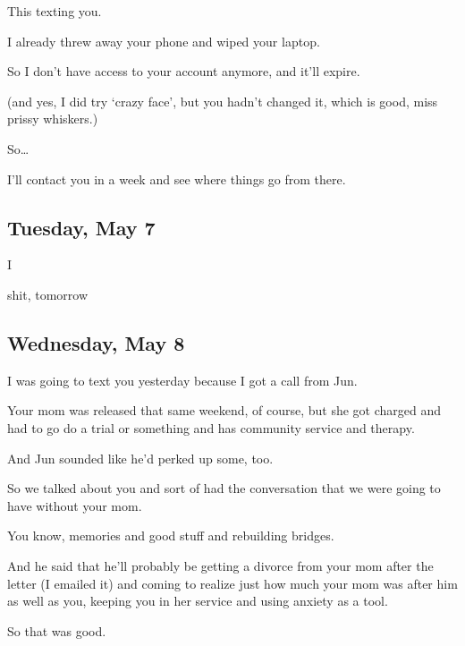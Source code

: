 { This texting you.

 I already threw away your phone and wiped your laptop.

 So I don't have access to your account anymore, and it'll expire.

(and yes, I did try `crazy face', but you hadn't changed it, which is good, miss prissy whiskers.)

 So\ldots{}

 I'll contact you in a week and see where things go from there.

\newpage

\subsection*{Tuesday, May 7}\label{tuesday-may-7}

 I

 shit, tomorrow

\newpage

\subsection*{Wednesday, May 8}\label{wednesday-may-8}

 I was going to text you yesterday because I got a call from Jun.

 Your mom was released that same weekend, of course, but she got charged and had to go do a trial or something and has community service and therapy.

 And Jun sounded like he'd perked up some, too.

 So we talked about you and sort of had the conversation that we were going to have without your mom.

 You know, memories and good stuff and rebuilding bridges.

 And he said that he'll probably be getting a divorce from your mom after the letter (I emailed it) and coming to realize just how much your mom was after him as well as you, keeping you in her service and using anxiety as a tool.

 So that was good.

}
